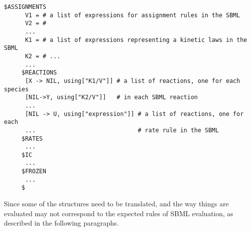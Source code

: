 \begin{Verbatim}[frame=single]
     $ASSIGNMENTS
      V1 = # a list of expressions for assignment rules in the SBML
      V2 = # 
      ...
      K1 = # a list of expressions representing a kinetic laws in the SBML
      K2 = # ...
      ...
     $REACTIONS
      [X -> NIL, using["K1/V"]] # a list of reactions, one for each species 
      [NIL->Y, using["K2/V"]]   # in each SBML reaction
      ...
      [NIL -> U, using["expression"]] # a list of reactions, one for each 
      ...                             # rate rule in the SBML
     $RATES
      ...
     $IC
      ...
     $FROZEN
      ...
     $
\end{Verbatim}

Since some of the structures need to be translated, and the way things are evaluated may not correspond to the expected rules of SBML evaluation, as described in the following paragraphs.


